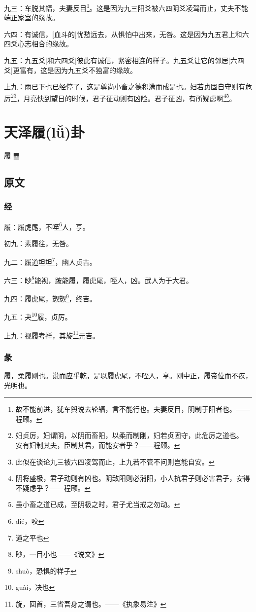 \documentclass[12pt,oneside]{book}
\begin{document}
九三：车脱其幅，夫妻反目\footnote{故不能前进，犹车舆说去轮辐，言不能行也。夫妻反目，阴制于阳者也。——程颐。}。这是因为九三阳爻被六四阴爻凌驾而止，丈夫不能端正家室的缘故。

六四：有诚信，[血斗的]忧愁远去，从惧怕中出来，无咎。这是因为九五君上和六四爻心志相合的缘故。

九五：九五爻[和六四爻]彼此有诚信，紧密相连的样子。九五爻让它的邻居[六四爻]更富有，这是因为九五爻不独富的缘故。

上九：雨已下也已经停了，这是尊尚小畜之德积满而成是也。妇若贞固自守则有危厉\footnote{ 妇贞厉，妇谓阴，以阴而畜阳，以柔而制刚，妇若贞固守，此危厉之道也。 安有妇制其夫，臣制其君，而能安者乎？——程颐。}\footnote{此似在谈论九三被六四凌驾而止，上九若不管不问则岂能自安。}，月亮快到望日的时候，君子征动则有凶险。君子征凶，有所疑虑啊\footnote{阴将盛极，君子动则有凶也。阴敌阳则必消阳，小人抗君子则必害君子，安得不疑虑乎？——程颐。}\footnote{虽小畜之道已成，至阴极之时，君子尤当戒之勿动。}。


\chapter{天泽履(lǚ)卦}
履 {\Large ䷉}

\section{原文}

\subsection{经}
履：履虎尾，不咥\footnote{dié，咬}人，亨。

初九：素履往，无咎。

九二：履道坦坦\footnote{道之平也}，幽人贞吉。

六三：眇\footnote{眇，一目小也——《说文》}能视，跛能履，履虎尾，咥人，凶。武人为于大君。

九四：履虎尾，愬愬\footnote{shuò，恐惧的样子}，终吉。

九五：夬\footnote{guài，决也}履，贞厉。

上九：视履考祥，其旋\footnote{旋，回首，三省吾身之谓也。——《执象易注》}元吉。

\subsection{彖}
履，柔履刚也。说而应乎乾，是以履虎尾，不咥人，亨。刚中正，履帝位而不疚，光明也。
\end{document}
